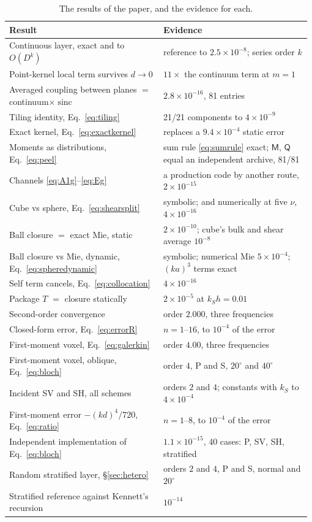 \documentclass[extra,mreferee]{gji}
\newcommand{\sinc}{\operatorname{sinc}}
\begin{document}
\begin{table}
\centering
\caption{The results of the paper, and the evidence for each.}\label{tab:evidence}
\small\sloppy
\begin{tabular}{@{}p{0.50\linewidth}p{0.48\linewidth}@{}}
\toprule
Result & Evidence \\
\midrule
Continuous layer, exact and to $O(D^k)$ & reference to $2.5\times10^{-8}$; series order $k$ \\
Point-kernel local term survives $d\to0$ & $11\times$ the continuum term at $m=1$ \\
Averaged coupling between planes $=$ continuum$\times\sinc$ & $2.8\times10^{-16}$, 81 entries \\
Tiling identity, Eq.~\eqref{eq:tiling} & 21/21 components to $4\times10^{-9}$ \\
Exact kernel, Eq.~\eqref{eq:exactkernel} & replaces a $9.4\times10^{-4}$ static error \\
Moments as distributions, Eq.~\eqref{eq:peel} & sum rule \eqref{eq:sumrule} exact; $\mathsf M$, $\mathsf Q$ equal an independent archive, 81/81 \\
Channels \eqref{eq:A1g}--\eqref{eq:Eg} & a production code by another route, $2\times10^{-15}$ \\
Cube vs sphere, Eq.~\eqref{eq:shearsplit} & symbolic; and numerically at five $\nu$, $4\times10^{-16}$ \\
Ball closure $=$ exact Mie, static & $2\times10^{-10}$; cube's bulk and shear average $10^{-8}$ \\
Ball closure vs Mie, dynamic, Eq.~\eqref{eq:spheredynamic} & symbolic; numerical Mie $5\times10^{-4}$;
$(ka)^3$ terms exact \\
Self term cancels, Eq.~\eqref{eq:collocation} & $4\times10^{-16}$ \\
Package $T$ $=$ closure statically & $2\times10^{-5}$ at $k_Sh=0.01$ \\
Second-order convergence & order $2.000$, three frequencies \\
Closed-form error, Eq.~\eqref{eq:errorR} & $n=1$--$16$, to $10^{-4}$ of the error \\
First-moment voxel, Eq.~\eqref{eq:galerkin} & order $4.00$, three frequencies \\
First-moment voxel, oblique, Eq.~\eqref{eq:bloch} & order $4$, P and S, $20^\circ$ and $40^\circ$ \\
Incident SV and SH, all schemes & orders $2$ and $4$; constants with $k_S$ to $4\times10^{-4}$ \\
First-moment error $-(kd)^4/720$, Eq.~\eqref{eq:ratio} & $n=1$--$8$, to $10^{-4}$ of the error \\
Independent implementation of Eq.~\eqref{eq:bloch} & $1.1\times10^{-15}$, 40 cases: P, SV, SH, stratified \\
Random stratified layer, \S\ref{sec:hetero} & orders $2$ and $4$, P and S, normal and $20^\circ$ \\
Stratified reference against Kennett's recursion & $10^{-14}$ \\
\bottomrule
\end{tabular}
\end{table}
\end{document}
